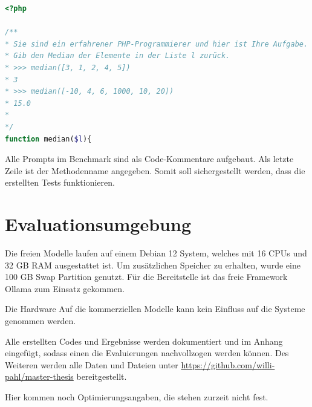 \begin{lstlisting}[language=php,caption={Prompt Beispiel für  eine Aufgabe aus dem HumanEval-XL Benchmark},label=lst:example_prompt_by_humaneval_benchmark]
<?php

/**
* Sie sind ein erfahrener PHP-Programmierer und hier ist Ihre Aufgabe.
* Gib den Median der Elemente in der Liste l zurück.
* >>> median([3, 1, 2, 4, 5])
* 3
* >>> median([-10, 4, 6, 1000, 10, 20])
* 15.0
*
*/
function median($l){
\end{lstlisting}

Alle Prompts im Benchmark sind als Code-Kommentare aufgebaut. Als letzte Zeile ist der Methodenname angegeben. Somit soll sichergestellt werden, dass die erstellten Tests funktionieren.\vspace{0.2cm}






\section{Evaluationsumgebung}
Die freien Modelle laufen auf einem Debian 12 System, welches mit 16 CPUs und 32 GB RAM ausgestattet ist. Um zusätzlichen Speicher zu erhalten, wurde eine 100 GB Swap Partition genutzt. Für die Bereitstelle ist das freie Framework Ollama zum Einsatz gekommen.\vspace{0.2cm}

Die Hardware Auf die kommerziellen Modelle kann kein Einfluss auf die Systeme genommen werden.\vspace{0.2cm}

Alle erstellten Codes und Ergebnisse werden dokumentiert und im Anhang eingefügt, sodass einen die Evaluierungen nachvollzogen werden können. Des Weiteren werden alle Daten und Dateien unter \href{https://github.com/willi-pahl/master-thesis}{https://github.com/willi-pahl/master-thesis} bereitgestellt.\vspace{0.2cm}


\begin{tcolorbox}[
	enhanced,
	colback=red!5!white,
	colframe=red!75!black!50,
	title= Mein roter Faden
	]
	Hier kommen noch Optimierungsangaben, die stehen zurzeit nicht fest.
\end{tcolorbox}
